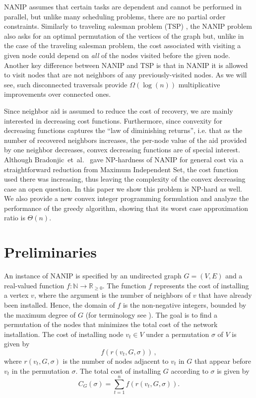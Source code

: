\documentclass[english]{llncs}
\begin{document}
NANIP assumes that certain tasks are dependent and cannot be performed in
parallel, but unlike many scheduling problems, there are no partial order
constraints.  Similarly to traveling salesman problem (TSP)
\cite{schrijver2005history}, the NANIP problem also asks for an optimal
permutation of the vertices of the graph but, unlike in the case of the
traveling salesman problem, the cost associated with visiting a given node
could depend on \emph{all} of the nodes visited before the given node. Another
key difference between NANIP and TSP is that in NANIP it is allowed to visit
nodes that are not neighbors of any previously-visited nodes. As we will see,
such disconnected traversals provide $\Omega(\log(n))$ multiplicative
improvements over connected ones.

Since neighbor aid is assumed to reduce the cost of recovery, we are mainly
interested in decreasing cost functions. Furthermore, since convexity for
decreasing functions captures the ``law of diminishing returns'', i.e. that as
the number of recovered neighbors increases, the per-node value of the aid
provided by one neighbor decreases, convex decreasing functions are of special
interest. Although Bradonjic~et~al.~\cite{Gutfraind14}  gave NP-hardness of
NANIP for general cost via a straightforward reduction from Maximum Independent
Set, the cost function used there was increasing, thus leaving the complexity
of the convex decreasing case an open question.  In this paper we show this
problem is NP-hard as well.  We also provide a new convex integer programming
formulation and analyze the performance of the greedy algorithm, showing that
its worst case approximation ratio is $\Theta(n)$.


\section{Preliminaries}
An instance of NANIP is specified by an undirected graph $G=(V,E)$ and a
real-valued function $f: \mathbb{N} \to \mathbb{R}_{\geq 0}$. The function $f$
represents the cost of installing a vertex $v$, where the argument is the
number of neighbors of $v$ that have already been installed. Hence, the domain
of $f$ is the non-negative integers, bounded by the maximum degree of $G$ (for
terminology see \cite{West01}).  The goal is to find a permutation of the nodes
that minimizes the total cost of the network installation. The cost of
installing node $v_t \in V$ under a permutation $\sigma$ of $V$ is given by
$$f(r(v_t, G, \sigma))\,,$$ where $r(v_t, G, \sigma)$ is the number of nodes
adjacent to $v_t$ in $G$ that appear before $v_t$ in the permutation $\sigma$.
The total cost of installing $G$ according to $\sigma$ is given by
\begin{equation} C_G(\sigma) = \sum_{t=1}^{n} f(r(v_t, G, \sigma)).
\label{eq:general-NANIP} \end{equation}
\end{document}
